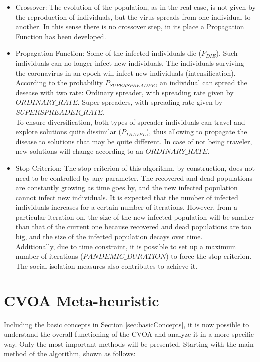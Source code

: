 \documentclass[letterpaper]{article}%
\begin{document}
\begin{itemize}
\item Crossover: The evolution of the population, as in the real case, is not given by the reproduction of individuals, but the virus spreads from one individual to another. In this sense there is no crossover step, in its place a Propagation Function has been developed.
\item Propagation Function:
Some of the infected individuals die ($P_{DIE}$). Such individuals can no longer infect new individuals.
The individuals surviving the coronavirus in an epoch will infect new individuals (intensification). According to the probability $P_{SUPERSPREADER}$, an individual can spread the desease with two rate:
\subitem Ordinary spreader, with spreading rate given by $ORDINARY\_RATE$.
\subitem Super-spreaders, with spreading rate given by $SUPERSPREADER\_RATE$.\\
To ensure diversification, both types of spreader individuals can travel and explore solutions quite dissimilar ($P_{TRAVEL}$), thus allowing to propagate the disease to solutions that may be quite different. In case of not being traveler, new solutions will change according to an $ORDINARY\_RATE$.
\item Stop Criterion:
The stop criterion of this algorithm, by construction, does not need to be controlled by any parameter. The recovered and dead populations are constantly growing as time goes by, and the new infected population cannot infect new individuals. It is expected that the number of infected individuals increases for a certain number of iterations. However, from a particular iteration on, the size of the new infected population will be smaller than that of the current one because recovered and dead populations are too big, and the size of the infected population decays over time. \\
Additionally, due to time constraint, it is possible to set up a maximum number of iterations ($PANDEMIC\_DURATION$) to force the stop criterion. The social isolation measures also contributes to achieve it.
\end{itemize}

\section{CVOA Meta-heuristic}
Including the basic concepts in Section \ref{sec:basicConcepts}, it is now possible to understand the overall functioning of the CVOA and analyze it in a more specific way.
Only the most important methods will be presented. Starting with the main method of the algorithm, shown as follows:
\end{document}
